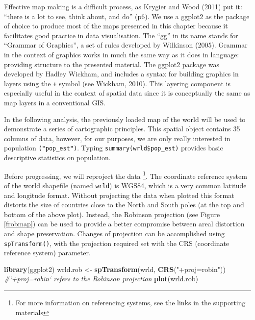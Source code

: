 \documentclass[]{article}
\newenvironment{Shaded}{}{}
\newcommand{\KeywordTok}[1]{\textcolor[rgb]{0.00,0.44,0.13}{\textbf{{#1}}}}
\newcommand{\StringTok}[1]{\textcolor[rgb]{0.25,0.44,0.63}{{#1}}}
\newcommand{\CommentTok}[1]{\textcolor[rgb]{0.38,0.63,0.69}{\textit{{#1}}}}
\newcommand{\NormalTok}[1]{{#1}}
\begin{document}
Effective map making is a difficult process, as Krygier and Wood (2011)
put it: ``there is a lot to see, think about, and do'' (p6). We use a
ggplot2 as the package of choice to produce most of the
maps presented in this chapter because it facilitates good
practice in data visualisation. The ``gg'' in its name stands for
``Grammar of Graphics'', a set of rules developed by Wilkinson (2005).
Grammar in the context of graphics works in much the same way as it does
in language: providing structure to the presented material. The
ggplot2 package was developed by Hadley Wickham, and includes a syntax for
building graphics in layers using the \texttt{+} symbol (see Wickham,
2010). This layering component is especially useful in the context of
spatial data since it is conceptually the same as map layers in a
conventional GIS.

In the following analysis, the previously loaded map of the world will be used to
demonstrate a series of cartographic principles. This spatial object contains 35
columns of data, however, for our purposes, we are only really interested
in population \texttt{("pop\_est")}. Typing
\texttt{summary(wrld\$pop\_est)} provides basic descriptive statistics
on population.

Before progressing, we will reproject the data \footnote{For more information on referencing systems, see the links in the supporting materials}.
The coordinate reference system of the world
shapefile (named \texttt{wrld}) is WGS84, which is a very common latitude and longitude
format. Without projecting the data when plotted this format distorts
the size of countries close to the North and South poles (at the top and
bottom of the above plot). Instead, the
Robinson projection (see Figure \ref{frobmap}) can be used to provide a better compromise between areal distortion
and shape preservation. Changes of projection can be accomplished using \texttt{spTransform()},
with the projection required set with the CRS (coordinate reference system) parameter.


\begin{Shaded}
\begin{Highlighting}[]
\KeywordTok{library}\NormalTok{(ggplot2)}
\NormalTok{wrld.rob <- }\KeywordTok{spTransform}\NormalTok{(wrld, }\KeywordTok{CRS}\NormalTok{(}\StringTok{"+proj=robin"}\NormalTok{))  }\CommentTok{#`+proj=robin` refers to the Robinson projection}
\KeywordTok{plot}\NormalTok{(wrld.rob)}
\end{Highlighting}
\end{Shaded}
\end{document}
